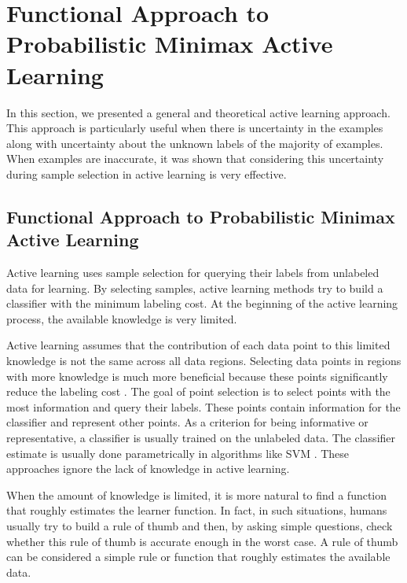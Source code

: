 	\section{Functional Approach to Probabilistic Minimax Active Learning}
	In this section, we presented a general and theoretical active learning approach. This approach is particularly useful when there is uncertainty in the examples along with uncertainty about the unknown labels of the majority of examples. When examples are inaccurate, it was shown that considering this uncertainty during sample selection in active learning is very effective.
	
	\subsection{Functional Approach to Probabilistic Minimax Active Learning}
	Active learning uses sample selection for querying their labels from unlabeled data for learning. By selecting samples, active learning methods try to build a classifier with the minimum labeling cost. At the beginning of the active learning process, the available knowledge is very limited.
	
	Active learning assumes that the contribution of each data point to this limited knowledge is not the same across all data regions. Selecting data points in regions with more knowledge is much more beneficial because these points significantly reduce the labeling cost \cite{freund1997selective, lewis1994heterogeneous}. The goal of point selection is to select points with the most information and query their labels. These points contain information for the classifier and represent other points. As a criterion for being informative or representative, a classifier is usually trained on the unlabeled data. The classifier estimate is usually done parametrically in algorithms like SVM \cite{schohn2000active, tong2001support}. These approaches ignore the lack of knowledge in active learning.
	
	When the amount of knowledge is limited, it is more natural to find a function that roughly estimates the learner function. In fact, in such situations, humans usually try to build a rule of thumb and then, by asking simple questions, check whether this rule of thumb is accurate enough in the worst case. A rule of thumb can be considered a simple rule or function that roughly estimates the available data.
	
